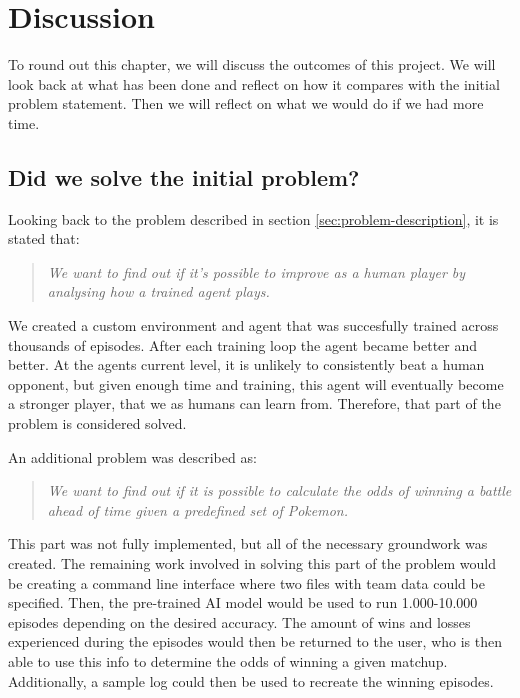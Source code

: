 \section{Discussion}
\label{sec:discussion}

To round out this chapter, we will discuss the outcomes of this project. We will look back at what has been done
and reflect on how it compares with the initial problem statement. Then we will reflect on what we would do if we had more time.

\subsection{Did we solve the initial problem?}
Looking back to the problem described in section \ref{sec:problem-description}, it is stated that: 
\begin{quote}
  \itshape{We want to find out if it's possible to improve as a human player by analysing how a trained agent plays.}
\end{quote}
We created a custom environment and agent that was succesfully trained across thousands of episodes. After each training 
loop the agent became better and better. At the agents current level, it is unlikely to consistently beat a human opponent,
but given enough time and training, this agent will eventually become a stronger player, that we as humans can learn from.
Therefore, that part of the problem is considered solved.

An additional problem was described as:
\begin{quote}
  \itshape{We want to find out if it is possible to calculate the odds of winning a battle ahead of time given a predefined set of Pokemon.}
\end{quote}
This part was not fully implemented, but all of the necessary groundwork was created. The remaining work involved in solving
this part of the problem would be creating a command line interface where two files with team data could be specified. 
Then, the pre-trained AI model would be used to run 1.000-10.000 episodes depending on the desired accuracy. The amount of wins
and losses experienced during the episodes would then be returned to the user, who is then able to use this info to determine 
the odds of winning a given matchup. Additionally, a sample log could then be used to recreate the winning episodes.

